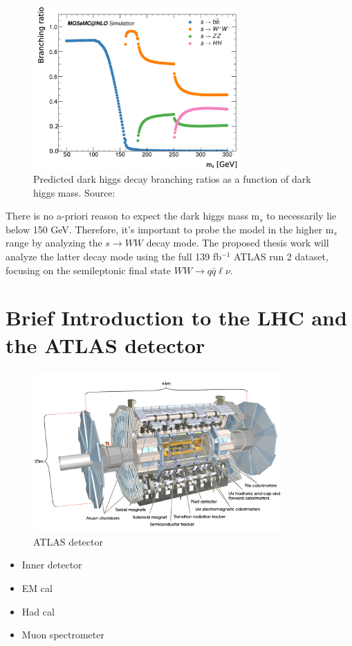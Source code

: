 \documentclass[12pt]{article}
\begin{document}
\begin{figure}[H]
	\centering
	\includegraphics[width=0.7\textwidth]{figures/BR_vs_mass.png}
	\caption[]{Predicted dark higgs decay branching ratios as a function of dark higgs mass. Source: \cite{monohbb_recast} }
	\label{fig:higgsbrs}
\end{figure}

There is no a-priori reason to expect the dark higgs mass m$_s$ to necessarily lie below 150 GeV. Therefore, it's important to probe the model in the higher m$_s$ range by analyzing the $s \rightarrow WW$ decay mode. The proposed thesis work will analyze the latter decay mode using the full 139 fb$^{-1}$ ATLAS run 2 dataset, focusing on the semileptonic final state $WW \rightarrow q\bar{q}\ell\nu$.

\section{Brief Introduction to the LHC and the ATLAS detector}
\begin{figure}[H]
	\centering
	\includegraphics[width=0.85\textwidth]{figures/detector.jpg}
	\caption[]{ATLAS detector}
	\label{fig:detector}
\end{figure}
\begin{itemize}
\item Inner detector
\item EM cal
\item Had cal
\item Muon spectrometer
\end{itemize}
\end{document}
